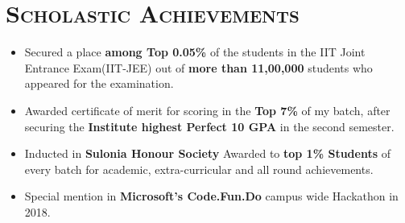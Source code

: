 \documentclass{article}
\newcommand{\tmpsection}[1]{}
\let\tmpsection=\section
\renewcommand{\section}[1]{\tmpsection*{\textsc{#1}}}
\begin{document}
\section{Scholastic Achievements}
\begin{itemize}
    \setlength\itemsep{0.0em}
    \item Secured a place \textbf{among Top 0.05\%} of the students in the IIT Joint Entrance Exam(IIT-JEE) out of  \textbf{more than 11,00,000} students who appeared for the examination.
    \item Awarded certificate of merit for scoring in the \textbf{Top 7\%} of my batch, after securing the \textbf{Institute highest Perfect 10 GPA} in the second semester.
    \item Inducted in \textbf{Sulonia Honour Society} Awarded to \textbf{top 1\% Students} of every batch for academic, extra-curricular and all round achievements.
    \item Special mention in \textbf{Microsoft's Code.Fun.Do} campus wide Hackathon in 2018.
    
\end{itemize}
\end{document}
